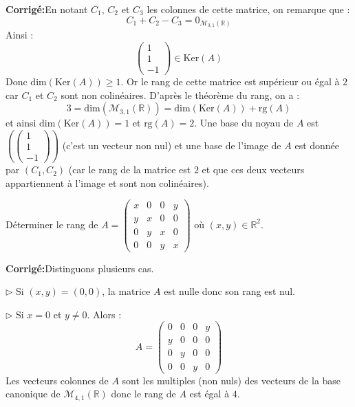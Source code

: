 \documentclass[a4paper,twoside,french,11pt]{VcCours}
\newcommand{\corr}{\textbf{Corrigé:}}
\begin{document}
\corr En notant $C_1$, $C_2$ et $C_3$ les colonnes de cette matrice, on remarque que :
$$C_1+C_2-C_3 = 0_{\mathcal{M}_{3,1}(\mathbb{R})}$$
Ainsi :
$$ \begin{pmatrix}
1 \\
1 \\
-1 
\end{pmatrix} \in \textrm{Ker}(A) $$
Donc $\textrm{dim}(\textrm{Ker}(A)) \geq 1$. Or le rang de cette matrice est supérieur ou égal à $2$ car $C_1$ et $C_2$ sont non colinéaires. D'après le théorème du rang, on a :
$$ 3=\textrm{dim}(\mathcal{M}_{3,1}(\mathbb{R})) = \textrm{dim}(\textrm{Ker}(A)) + \textrm{rg}(A)$$
et ainsi $\textrm{dim}(\textrm{Ker}(A)) = 1$ et $\textrm{rg}(A)=2$. Une base du noyau de $A$ est $\left(  \begin{pmatrix}
1 \\
1 \\
-1 
\end{pmatrix} \right)$ (c'est un vecteur non nul) et une base de l'image de $A$ est donnée par $(C_1,C_2)$ (car le rang de la matrice est $2$ et que ces deux vecteurs appartiennent à l'image et sont non colinéaires).



\begin{Exercice}{} Déterminer le rang de $A = \begin{pmatrix}
x & 0 & 0& y \\
y & x & 0 & 0 \\
0 & y & x & 0 \\
0 & 0 & y & x
\end{pmatrix}$ où $(x,y) \in \mathbb{R}^2$.
\end{Exercice} 

\corr Distinguons plusieurs cas.



\noindent $\rhd$ Si $(x,y)=(0,0)$, la matrice $A$ est nulle donc son rang est nul.



\noindent $\rhd$ Si $x=0$ et $y \neq 0$. Alors :
$$ A = \begin{pmatrix}
0 & 0 & 0& y \\
y & 0 & 0 & 0 \\
0 & y & 0 & 0 \\
0 & 0 & y & 0
\end{pmatrix}$$
Les vecteurs colonnes de $A$ sont les multiples (non nuls) des vecteurs de la base canonique de $\mathcal{M}_{4,1}(\mathbb{R})$ donc le rang de $A$ est égal à $4$.
\end{document}
